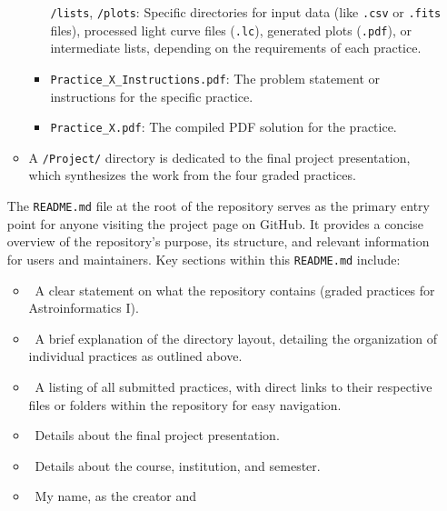 \documentclass[a4paper,12pt]{article}
\DeclareRobustCommand{\regular}{\fontseries{m}\selectfont}
\DeclareRobustCommand{\sbold}{\fontseries{sb}\selectfont}
\DeclareRobustCommand{\bold}{\fontseries{b}\selectfont}
\newcommand{\bcode}[1]{\texttt{\fontsize{11}{13}\selectfont\bold#1}}
\newenvironment{solution}{}{}
\begin{document}
\begin{enumerate}
\begin{solution}
\begin{itemize}
\begin{itemize}
                    \bcode{/lists}, \bcode{/plots}: Specific directories for input
                    data (like \bcode{.csv} or \bcode{.fits} files), processed
                    light curve files (\bcode{.lc}), generated plots (\bcode{.pdf}),
                    or intermediate lists, depending on the requirements of each
                    practice.
                    \item \bcode{Practice\_X\_Instructions.pdf}: The problem
                    statement or instructions for the specific practice.
                    \item \bcode{Practice\_X.pdf}: The compiled PDF solution for
                    the practice.
                \end{itemize}
                \item A \bcode{/Project/} directory is dedicated to the final
                project presentation, which synthesizes the work from the four
                graded practices.
            \end{itemize}
            The \bcode{README.md} file at the root of the repository serves as the
            primary entry point for anyone visiting the project page on GitHub.
            It provides a concise overview of the repository's purpose, its
            structure, and relevant information for users and maintainers. Key
            sections within this \bcode{README.md} include:
            \begin{itemize}
                \item \sbold{Project Purpose:}\regular\ A clear statement on what
                the repository contains (graded practices for Astroinformatics I).
                \item \sbold{Repository Structure:}\regular\ A brief explanation
                of the directory layout, detailing the organization of individual
                practices as outlined above.
                \item \sbold{Practices:}\regular\ A listing of all submitted
                practices, with direct links to their respective files or folders
                within the repository for easy navigation.
                \item \sbold{Project Presentation:}\regular\ Details about the final
                project presentation.
                \item \sbold{Course Information:}\regular\ Details about the course,
                institution, and semester.
                \item \sbold{Author:}\regular\ My name, as the creator and

\end{itemize}
\end{solution}
\end{enumerate}
\end{document}

